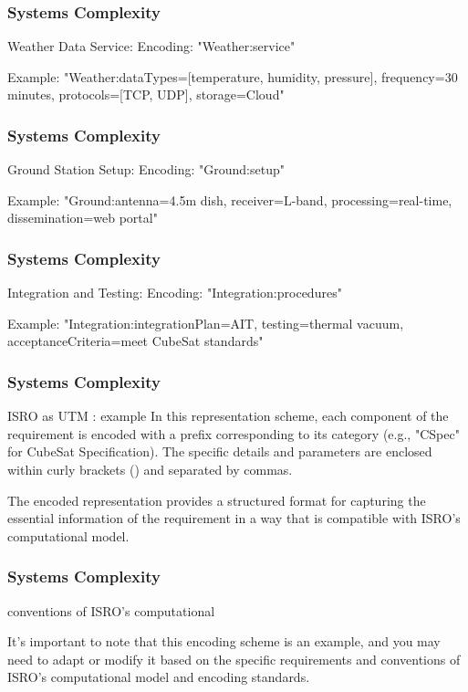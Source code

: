 \newpage
\begin{frame}
\frametitle{Systems Complexity }
\begin{block}{ Weather Data Service: }
Encoding: "Weather:{service}"

Example: "Weather:{dataTypes=[temperature, humidity, pressure], frequency=30 minutes, protocols=[TCP, UDP], storage=Cloud}"

\end{block}
\end{frame}

\newpage
\begin{frame}
\frametitle{Systems Complexity }
\begin{block}{ Ground Station Setup: }
Encoding: "Ground:{setup}"

Example: "Ground:{antenna=4.5m dish, receiver=L-band, processing=real-time, dissemination=web portal}"

\end{block}
\end{frame}

\newpage
\begin{frame}
\frametitle{Systems Complexity }
\begin{block}{ Integration and Testing: }
Encoding: "Integration:{procedures}"

Example: "Integration:{integrationPlan=AIT, testing=thermal vacuum, acceptanceCriteria=meet CubeSat standards}"

\end{block}
\end{frame}

\newpage
\begin{frame}
\frametitle{Systems Complexity }
\begin{block}{ ISRO as UTM  : example }
In this representation scheme, each component of the requirement is encoded with a prefix corresponding to its category (e.g., "CSpec" for CubeSat Specification). The specific details and parameters are enclosed within curly brackets ({}) and separated by commas.

The encoded representation provides a structured format for capturing the essential information of the requirement in a way that is compatible with ISRO's computational model.

\end{block}
\end{frame}

\newpage
\begin{frame}
\frametitle{Systems Complexity }
\begin{block}{ conventions of ISRO's computational}

It's important to note that this encoding scheme is an example, and you may need to adapt or modify it based on the specific requirements and conventions of ISRO's computational model and encoding standards.
\end{block}
\end{frame}


